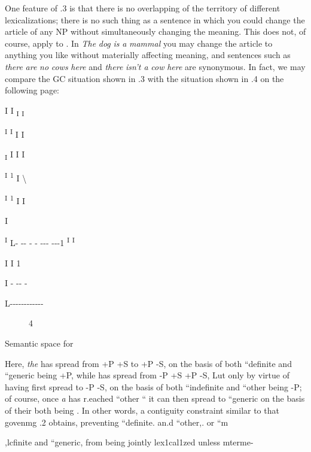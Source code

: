 One feature of .3 is that there is no overlapping of the territory of different lexicalizations; there is no such thing  as a sentence in which you could change the article of any NP without simultaneously changing the meaning. This  does not, of course, apply to . In \textit{The} \textit{dog} \textit{is} \textit{a} \textit{mammal} you may change the article to anything you like without materially affecting meaning, and sentences such as \textit{there} \textit{are} \textit{no} \textit{cows} \textit{here} and \textit{there} \textit{isn't a} \textit{cow} \textit{here} are synonymous. In fact, we may compare the GC situation shown in .3 with the  situation shown in .4 on the following page:

I I \textsubscript{I }\textsubscript{I}

\textsuperscript{I }\textsuperscript{I }I I 

\textsubscript{I }I I I

\textsuperscript{I }\textsuperscript{1 }I {\textbackslash}

\textsuperscript{I }\textsuperscript{1 }I I 

I

\textsuperscript{I }L- {}-{}- {}- {}- {}-{}-{}- {}-{}-{}-1 \textsuperscript{I }\textsuperscript{I} 

I I 1 

I  - {}-{}- - 

L-{}-{}-{}-{}-{}-{}-{}-{}-{}-{}-{}-

\begin{figure}
\caption{4}
\label{fig:4}
\end{figure}

Semantic space for  

Here, \textit{the} has spread from +P +S to +P -S, on the basis of both ``defi\-nite and ``generic being +P, while has spread from {}-P +S +P {}-S, Lut only by virtue of having first spread to {}-P {}-S, on the basis of both ``indefinite and ``other being {}-P; of course, once \textit{a} has r.eached ``other `` it can then spread to ``generic on the basis of their both being . In other words, a contiguity constraint similar to that goven\-mg .2 obtains, preventing ``definite{\textquotedbl}. an.d ``other,. or ``m\-

,lcfinite and ``generic, from being jointly lex1cal1zed unless mterme-

